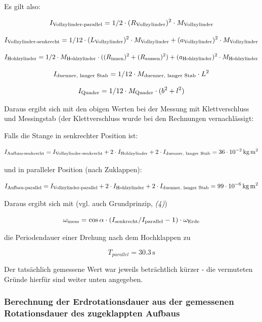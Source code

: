 \documentclass[11pt]{scrartcl}
\newcommand{\unit}[1]{\ensuremath{\,\mathrm{#1}}} %
\newcommand{\ltext}[1]{\ensuremath{_{\textnormal{#1}}}}
\begin{document}
Es gilt also:

\[
I_{\textnormal{Vollzylinder-parallel}}=1/2 \cdot (R_{\textnormal{Vollzylinder}})^2 \cdot M_{\textnormal{Vollzylinder}}\]



\[I_{\textnormal{Vollzylinder-senkrecht}}=1/12 \cdot (L_{\textnormal{Vollzylinder}})^2 \cdot M_{\textnormal{Vollzylinder}} +(a_{\textnormal{Vollzylinder}})^2 \cdot M_{\textnormal{Vollzylinder}}\]


\[I_{\textnormal{Hohlzylinder}}=1/2 \cdot M_{\textnormal{Hohlzylinder}} \cdot ((R_{\textnormal{innen}})^2+(R_{\textnormal{aussen}})^2)+(a_{\textnormal{Hohlzylinder}})^2 \cdot M_{\textnormal{Hohlzylinder}}\]


\[I_{\textnormal{duenner, langer Stab}}=1/12 \cdot M_{\textnormal{duenner, langer Stab}} \cdot L^2\]



\[I_{\textnormal{Quader}}=1/12 \cdot M_{\textnormal{Quader}} \cdot (b^2+l^2)\]

Daraus ergibt sich mit den obigen Werten bei der Messung mit Klettverschluss und Messingstab (der Klettverschluss wurde bei den Rechnungen vernachl\"assigt:


Falls die Stange in senkrechter Position ist:

\[I_{\textnormal{Aufbau-senkrecht}}=I_{\textnormal{Vollzylinder-senkrecht}}+2 \cdot I_{\textnormal{Hohlzylinder}} + 2 \cdot I_{\textnormal{duenner, langer Stab}}=36 \cdot 10^{-2} \unit{kg} \unit{m^2}\]


und in paralleler Position (nach Zuklappen):

\[I_{\textnormal{Aufbau-parallel}}=I_{\textnormal{Vollzylinder-parallel}}+2 \cdot I_{\textnormal{Hohlzylinder}} + 2 \cdot I_{\textnormal{duenner, langer Stab}}=99 \cdot 10^{-6} \unit{kg} \unit{m^2}\]

Daraus ergibt sich mit (vgl. auch Grundprinzip, \textit{(4)})

\[\omega\ltext{mess} = 
\cos\alpha \cdot (I\ltext{senkrecht} / I\ltext{parallel} - 1) \cdot \omega\ltext{Erde}\]

die Periodendauer einer Drehung nach dem Hochklappen zu

\[T_{parallel}=30.3 \unit{s}\]

Der tats\"achlich gemessene Wert war jeweils betr\"achtlich k\"urzer - die vermuteten Gr\"unde hierf\"ur sind weiter unten angegeben.

\subsubsection{Berechnung der Erdrotationsdauer aus der gemessenen Rotationsdauer des zugeklappten Aufbaus}
\end{document}
